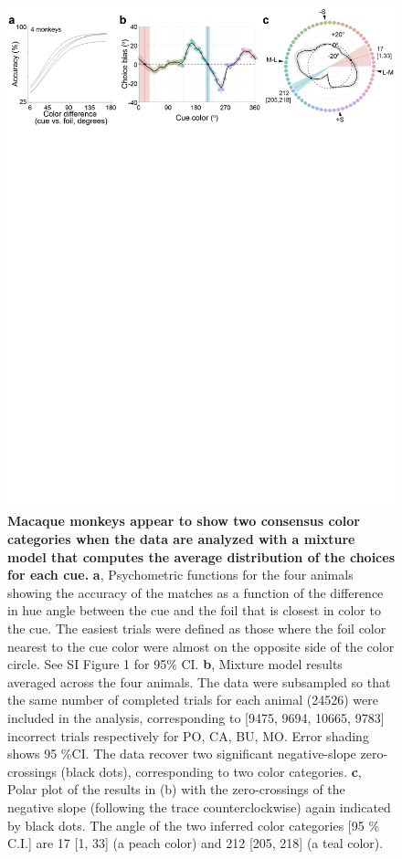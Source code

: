 \documentclass[9pt,biorxiv,lineno,onehalfspacing]{lapreprint}
\begin{document}
\begin{refsection}
\begin{figure}
    \begin{fullwidth}
    \centering
    \includegraphics[width=\textwidth+4cm,trim={0 21cm 0 0},clip]{F2_CombinedMMResults_6.pdf}
    \caption{\textbf{Macaque monkeys appear to show two consensus color categories when the data are analyzed with a mixture model that computes the average distribution of the choices for each cue.}
	\textbf{a}, Psychometric functions for the four animals showing the accuracy of the matches as a function of the difference in hue angle between the cue and the foil that is closest in color to the cue. 
	The easiest trials were defined as those where the foil color nearest to the cue color were almost on the opposite side of the color circle. See SI Figure 1 for 95\% CI. 
	\textbf{b}, Mixture model results averaged across the four animals. 
    The data were subsampled so that the same number of completed trials for each animal (24526) were included in the analysis, corresponding to [9475, 9694, 10665, 9783] incorrect trials respectively for PO, CA, BU, MO. 
    Error shading shows 95 \%CI. 
	The data recover two significant negative-slope zero-crossings (black dots), corresponding to two color categories. 
	\textbf{c}, Polar plot of the results in (b) with the zero-crossings of the negative slope (following the trace counterclockwise) again indicated by black dots. 
    The angle of the two inferred color categories [95 \% C.I.] are 17 [1, 33] (a peach color) and 212 [205, 218] (a teal color). }
    \label{fig:AvResults}
    \end{fullwidth}
\end{figure}


\end{refsection}
\end{document}
